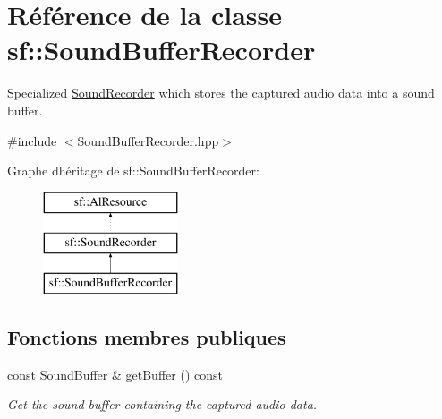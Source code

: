 \hypertarget{classsf_1_1SoundBufferRecorder}{}\section{Référence de la classe sf\+:\+:Sound\+Buffer\+Recorder}
\label{classsf_1_1SoundBufferRecorder}


Specialized \hyperlink{classsf_1_1SoundRecorder}{Sound\+Recorder} which stores the captured audio data into a sound buffer.  




{\ttfamily \#include $<$Sound\+Buffer\+Recorder.\+hpp$>$}

Graphe d\textquotesingle{}héritage de sf\+:\+:Sound\+Buffer\+Recorder\+:\begin{figure}[H]
\begin{center}
\leavevmode
\includegraphics[height=3.000000cm]{classsf_1_1SoundBufferRecorder}
\end{center}
\end{figure}
\subsection*{Fonctions membres publiques}
\begin{DoxyCompactItemize}
\item 
const \hyperlink{classsf_1_1SoundBuffer}{Sound\+Buffer} \& \hyperlink{classsf_1_1SoundBufferRecorder_aa3a8d7a612cb885ed2f58bb86aa24acb}{get\+Buffer} () const
\begin{DoxyCompactList}\small\item\em Get the sound buffer containing the captured audio data. \end{DoxyCompactList}\end{DoxyCompactItemize}
